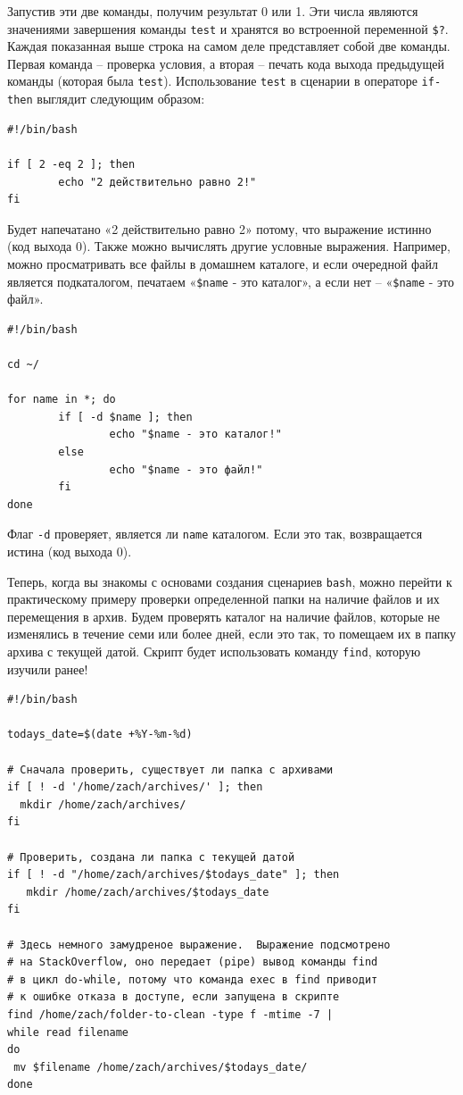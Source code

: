 \documentclass[12pt]{article}
\begin{document}
Запустив эти две команды, получим результат 0 или 1. Эти числа являются
значениями завершения команды \texttt{test} и хранятся во встроенной переменной
\texttt{\$?}. Каждая показанная выше строка на самом деле представляет
собой две команды. Первая команда -- проверка условия, а вторая -- печать
кода выхода предыдущей команды (которая была \texttt{test}). Использование \texttt{test} в
сценарии в операторе \texttt{if-then} выглядит следующим образом:
\begin{verbatim}
#!/bin/bash

if [ 2 -eq 2 ]; then
        echo "2 действительно равно 2!"
fi
\end{verbatim}

Будет напечатано «2 действительно равно 2» потому, что выражение истинно
(код выхода 0). Также можно вычислять другие условные выражения.
Например, можно просматривать все файлы в домашнем каталоге, и если
очередной файл является подкаталогом, печатаем «\texttt{\$name} - это каталог», а
если нет -- «\texttt{\$name} - это файл».

\begin{verbatim}
#!/bin/bash

cd ~/

for name in *; do
        if [ -d $name ]; then
                echo "$name - это каталог!"
        else
                echo "$name - это файл!"
        fi
done
\end{verbatim}

Флаг \texttt{-d} проверяет, является ли \texttt{name} каталогом. Если это так,
возвращается истина (код выхода 0).

Теперь, когда вы знакомы с основами создания сценариев \texttt{bash}, можно
перейти к практическому примеру проверки определенной папки на наличие
файлов и их перемещения в архив. Будем проверять каталог на наличие
файлов, которые не изменялись в течение семи или более дней, если это
так, то помещаем их в папку архива с текущей датой. Скрипт будет
использовать команду \texttt{find}, которую изучили ранее!
\begin{verbatim}
#!/bin/bash

todays_date=$(date +%Y-%m-%d)

# Сначала проверить, существует ли папка с архивами
if [ ! -d '/home/zach/archives/' ]; then
  mkdir /home/zach/archives/
fi

# Проверить, создана ли папка с текущей датой
if [ ! -d "/home/zach/archives/$todays_date" ]; then
   mkdir /home/zach/archives/$todays_date
fi

# Здесь немного замудреное выражение.  Выражение подсмотрено
# на StackOverflow, оно передает (pipe) вывод команды find
# в цикл do-while, потому что команда exec в find приводит
# к ошибке отказа в доступе, если запущена в скрипте
find /home/zach/folder-to-clean -type f -mtime -7 |
while read filename
do
 mv $filename /home/zach/archives/$todays_date/
done
\end{verbatim}
\end{document}
